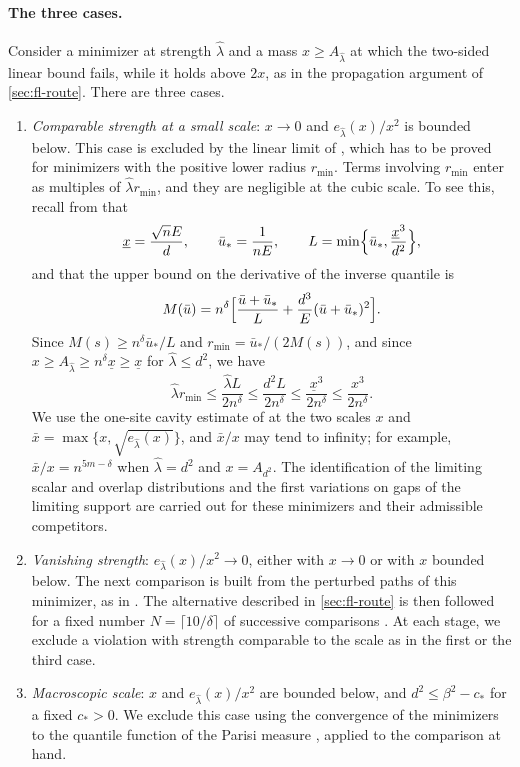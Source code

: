 \paragraph{The three cases.} Consider a minimizer at strength ${\widehat\lambda}$ and a mass $x\ge A_{\widehat\lambda}$ at which the two-sided linear bound fails, while it holds above $2x$, as in the propagation argument of \cref{sec:fl-route}. There are three cases.
\begin{enumerate}
\item \emph{Comparable strength at a small scale}: $x\to0$ and $e_{\widehat\lambda}(x)/x^2$ is bounded below. This case is excluded by the linear limit of \cite[Theorem~5.1]{oai-fluctuations}, which has to be proved for minimizers with the positive lower radius $r_{\min}$. Terms involving $r_{\min}$ enter as multiples of ${\widehat\lambda} r_{\min}$, and they are negligible at the cubic scale. To see this, recall from \cite[(3) and (5)]{oai-fluctuations} that
\[
 \underline x=\frac{\sqrt nE}{d},\qquad {\bar u}_*=\frac1{nE},\qquad L=\min\Bigl\{{\bar u}_*,\frac{\underline x^3}{d^2}\Bigr\},
\]
and that the upper bound on the derivative of the inverse quantile is
\[
 M({\bar u})=n^\delta\Bigl[\frac{{\bar u}+{\bar u}_*}{L}+\frac{d^3}{E}({\bar u}+{\bar u}_*)^2\Bigr].
\]
Since $M(s)\ge n^\delta {\bar u}_*/L$ and $r_{\min}={\bar u}_*/(2M(s))$, and since $x\ge A_{\widehat\lambda}\ge n^\delta\underline x\ge\underline x$ for ${\widehat\lambda}\le d^2$, we have
\[
 {\widehat\lambda} r_{\min}\le\frac{{\widehat\lambda} L}{2n^\delta}\le\frac{d^2L}{2n^\delta}\le\frac{\underline x^3}{2n^\delta}\le\frac{x^3}{2n^\delta}.
\]
We use the one-site cavity estimate of \cite[Proposition~4.1]{oai-fluctuations} at the two scales $x$ and $\bar x=\max\{x,\sqrt{e_{\widehat\lambda}(x)}\}$, and $\bar x/x$ may tend to infinity; for example, $\bar x/x=n^{5m-\delta}$ when ${\widehat\lambda}=d^2$ and $x=A_{d^2}$. The identification of the limiting scalar and overlap distributions \cite[Lemma~5.4]{oai-fluctuations} and the first variations on gaps of the limiting support \cite[Lemma~5.6]{oai-fluctuations} are carried out for these minimizers and their admissible competitors.
\item \emph{Vanishing strength}: $e_{\widehat\lambda}(x)/x^2\to0$, either with $x\to0$ or with $x$ bounded below. The next comparison is built from the perturbed paths of this minimizer, as in \cite[Lemma~6.2]{oai-fluctuations}. The alternative described in \cref{sec:fl-route} is then followed for a fixed number $N=\lceil10/\delta\rceil$ of successive comparisons \cite[Lemmas~6.3--6.5 and Proposition~6.6]{oai-fluctuations}. At each stage, we exclude a violation with strength comparable to the scale as in the first or the third case.
\item \emph{Macroscopic scale}: $x$ and $e_{\widehat\lambda}(x)/x^2$ are bounded below, and $d^2\le\beta^2-c_*$ for a fixed $c_*>0$. We exclude this case using the convergence of the minimizers to the quantile function of the Parisi measure \cite[Proposition~5.9]{oai-fluctuations}, applied to the comparison at hand.
\end{enumerate}
